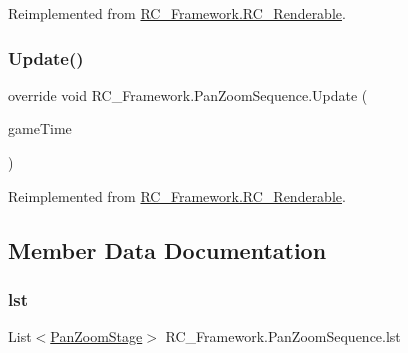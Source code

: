 Reimplemented from \mbox{\hyperlink{class_r_c___framework_1_1_r_c___renderable_ae65ce69704d15963789f421b58618b1f}{R\+C\+\_\+\+Framework.\+R\+C\+\_\+\+Renderable}}.

\mbox{\label{class_r_c___framework_1_1_pan_zoom_sequence_a1c15ccaf96c79adece0f665f1419f95b}} 
\subsubsection{\texorpdfstring{Update()}{Update()}}
{\footnotesize\ttfamily override void R\+C\+\_\+\+Framework.\+Pan\+Zoom\+Sequence.\+Update (\begin{DoxyParamCaption}\item[{Game\+Time}]{game\+Time }\end{DoxyParamCaption})\hspace{0.3cm}{\ttfamily [virtual]}}



Reimplemented from \mbox{\hyperlink{class_r_c___framework_1_1_r_c___renderable_a5745bedc7ba0587aa1e1d8563c357228}{R\+C\+\_\+\+Framework.\+R\+C\+\_\+\+Renderable}}.



\subsection{Member Data Documentation}
\mbox{\label{class_r_c___framework_1_1_pan_zoom_sequence_ae20aeed249f040a8f132657fae2087ec}} 
\subsubsection{\texorpdfstring{lst}{lst}}
{\footnotesize\ttfamily List$<$\mbox{\hyperlink{class_r_c___framework_1_1_pan_zoom_stage}{Pan\+Zoom\+Stage}}$>$ R\+C\+\_\+\+Framework.\+Pan\+Zoom\+Sequence.\+lst}



